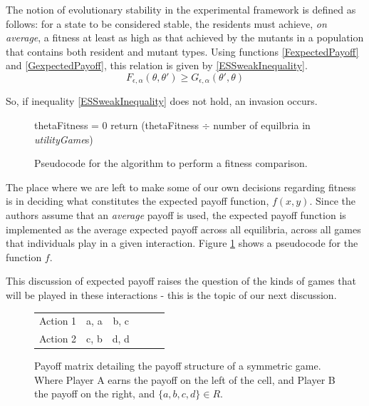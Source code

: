 \documentclass[11pt]{book}
\newcommand*{\np}{\par\noindent\newline}
\begin{document}
\np The notion of evolutionary stability \citep{smith_logic_1973} in the experimental framework is defined as follows: for a state to be considered stable, the residents must achieve, \textit{on average}, a fitness at least as high as that achieved by the mutants in a population that contains both resident and mutant types.
Using functions \ref{FexpectedPayoff} and \ref{GexpectedPayoff}, this relation is given by \ref{ESSweakInequality}.
\begin{equation}
	\label{ESSweakInequality}
	F_{\epsilon, \alpha}(\theta, \theta') \geq G_{\epsilon, \alpha}(\theta', \theta)
\end{equation}
\citet[~p. 44]{alger_generalization_2012}
\np So, if inequality \ref{ESSweakInequality} does not hold, an invasion occurs.

\begin{figure}[H]
	\centering
	\begin{algorithm}[H]
		thetaFitness = 0\;
		return (thetaFitness $\div$ number of equilbria in \textit{utilityGame}s)\;
	   \end{algorithm}
	\caption{Pseudocode for the algorithm to perform a fitness comparison.}
	\label{psuedocodeForf}
\end{figure}

\np The place where we are left to make some of our own decisions regarding fitness is in deciding what constitutes the expected payoff function, $f(x,y)$.
Since the authors assume that an \textit{average} payoff is used, the expected payoff function is implemented as the average expected payoff across all equilibria, across all games that individuals play in a given interaction.
Figure \ref{psuedocodeForf} shows a pseudocode for the function $f$.

\np This discussion of expected payoff raises the question of the kinds of games that will be played in these interactions - this is the topic of our next discussion.

\begin{figure}[H]
	\vspace{30px}
	\centering
	\begin{tabular}{|l||*{5}{c|}}\hline
		\backslashbox{Player A}{Player B}
		&\makebox[7em]{Action 1}&\makebox[7em]{Action 2}\\\hline\hline
		Action 1 & a, a & b, c\\\hline
		Action 2 & c, b & d, d \\\hline
	\end{tabular}
	\caption{Payoff matrix detailing the payoff structure of a symmetric game. Where Player A earns the payoff on the left of the cell, and Player B the payoff on the right, and $\{a, b, c, d\} \in R$.}
	\label{symmetricGame}
	\vspace{20px}
\end{figure}
\end{document}
